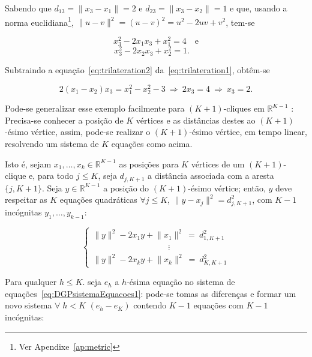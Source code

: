  Sabendo que $d_{13} = \lVert x_3 - x_1\rVert = 2$ e $d_{23} = \lVert x_3 - x_2 \rVert = 1$ e que, usando a norma euclidiana\footnote{Ver Apendixe~\ref{ap:metric}}, $\lVert u-v\rVert^2 = (u-v)^2 = u^2 -2uv + v^2$, tem-se

\begin{equation}
	x_3^2 - 2x_1x_3 +x_1^2 = 4 \quad \textrm{e}
	\label{eq:trilateration1}
\end{equation}
\begin{equation}
x_3^2 - 2x_2x_3 +x_2^2 = 1. \quad
\label{eq:trilateration2}
\end{equation}

Subtraindo a equação~\ref{eq:trilateration2} da~\ref{eq:trilateration1}, obtêm-se

\begin{equation*}
	2(x_1-x_2)x_3 = x_1^2 - x_2^2 - 3 \ \Rightarrow \ 2x_3 = 4 \ \Rightarrow \ x_3 = 2.
\end{equation*}

Pode-se generalizar esse exemplo facilmente para $(K+1)$-cliques em $\mathbb{R}^{K-1}$ \cite{libertiEDG}: Precisa-se conhecer a posição de $K$ vértices e as distâncias destes ao $(K+1)$-ésimo vértice, assim, pode-se realizar o $(K+1)$-ésimo vértice, em tempo linear, resolvendo um sistema de $K$ equações como acima.

Isto é, sejam $x_1, \dots, x_k \in \mathbb{R}^{K-1}$ as posições para $K$ vértices de um $(K+1)$-clique e, para todo $j\leq K$, seja $d_{j,K+1}$ a distância associada com a aresta $\{j, K+1\}$. Seja $y \in \mathbb{R}^{K-1}$ a posição do $(K+1)$-ésimo vértice; então, $y$ deve respeitar as $K$ equações quadráticas $\forall j\leq K$, $\lVert y-x_j\rVert^2 = d_{j,K+1}^2$, com $K-1$ incógnitas  $y_1, \dots,y_{k-1}$:

\begin{equation}
	\begin{cases} 
		\lVert y \rVert^2 -2x_1y + \lVert x_1\rVert^2 \ = \ d^2_{1,K+1}
		\\
		\qquad\qquad\qquad\quad\qquad \!\vdots
		\\
		\lVert y \rVert^2 -2x_ky + \lVert x_k\rVert^2 \ = \ d^2_{K,K+1}
	\end{cases}
	\label{eq:DGPsistemaEquacoes1}
\end{equation}

Para qualquer $h\leq K$. seja $e_h$ a $h$-ésima equação no sistema de equações~\ref{eq:DGPsistemaEquacoes1}: pode-se tomas as diferenças e formar um novo sistema $\forall\; h<K$ $(e_h-e_K)$ contendo $K-1$ equações com $K-1$ incógnitas:

